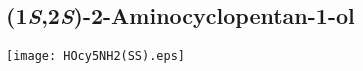 %
%
%
%
%


\subsection{(1\textit{S},2\textit{S})\hyp{}2\hyp{}Aminocyclopentan\hyp{}1\hyp{}ol }


\begin{scheme}[H]
	\begin{center}
		\texttt{[image: HOcy5NH2(SS).eps]}
	\end{center}
\end{scheme}

